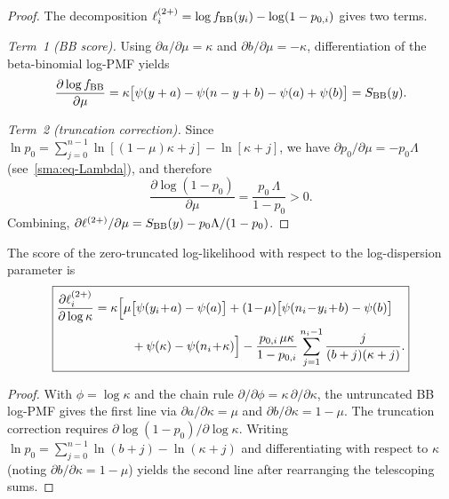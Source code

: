 \begin{proof}
  The decomposition $\ell_i^{(2+)} = \log f_{\textup{BB}}(y_i)
  - \log(1-p_{0,i})$ gives two terms.

  \medskip\noindent\textit{Term~1 (BB score).}\enspace
  Using $\partial a/\partial\mu = \kappa$ and
  $\partial b/\partial\mu = -\kappa$, differentiation of the
  beta-binomial log-PMF yields
  \[
    \frac{\partial\log f_{\textup{BB}}}{\partial\mu}
    = \kappa\bigl[\psi(y+a) - \psi(n-y+b) - \psi(a) + \psi(b)\bigr]
    = S_{\textup{BB}}(y).
  \]

  \medskip\noindent\textit{Term~2 (truncation correction).}\enspace
  Since $\ln p_0 = \sum_{j=0}^{n-1}\ln[(1-\mu)\kappa + j]
  - \ln[\kappa + j]$, we have $\partial p_0/\partial\mu = -p_0\Lambda$
  (see~\cref{sma:eq-Lambda}), and therefore
  \[
    \frac{\partial\log(1-p_0)}{\partial\mu}
    = \frac{p_0\,\Lambda}{1-p_0}
    > 0.
  \]
  Combining, $\partial\ell^{(2+)}/\partial\mu
  = S_{\textup{BB}}(y) - p_0\Lambda/(1-p_0)$.
\end{proof}


\begin{proposition}
\label{smb:prop-score-kappa}
  The score of the zero-truncated log-likelihood with respect to the
  log-dispersion parameter is
  \begin{equation}\label{smb:eq-score-kappa}
    \boxed{%
    \begin{aligned}
      \frac{\partial\ell_i^{(2+)}}{\partial\log\kappa}
      &= \kappa\Bigl[
           \mu\bigl[\psi(y_i\!+\!a)-\psi(a)\bigr]
           + (1\!-\!\mu)\bigl[\psi(n_i\!-\!y_i\!+\!b)-\psi(b)\bigr]
      \\
      &\qquad\quad
           + \psi(\kappa)-\psi(n_i\!+\!\kappa)
         \Bigr]
       - \frac{p_{0,i}\,\mu\kappa}{1-p_{0,i}}
         \sum_{j=1}^{n_i-1}
         \frac{j}{(b+j)(\kappa+j)}.
    \end{aligned}
    }
  \end{equation}
\end{proposition}

\begin{proof}
  With $\phi = \log\kappa$ and the chain rule
  $\partial/\partial\phi = \kappa\,\partial/\partial\kappa$, the
  untruncated BB log-PMF gives the first line
  via $\partial a/\partial\kappa = \mu$ and
  $\partial b/\partial\kappa = 1-\mu$.  The truncation correction
  requires $\partial\log(1-p_0)/\partial\log\kappa$.  Writing
  $\ln p_0 = \sum_{j=0}^{n-1}\ln(b+j) - \ln(\kappa+j)$ and
  differentiating with respect to $\kappa$ (noting
  $\partial b/\partial\kappa = 1-\mu$) yields the second line after
  rearranging the telescoping sums.
\end{proof}

